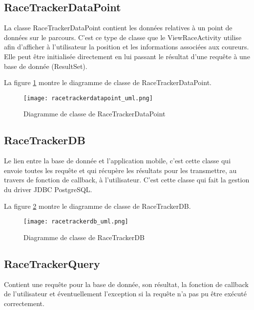 \subsection{RaceTrackerDataPoint}

La classe RaceTrackerDataPoint contient les données relatives à un point de données sur le parcours. C'est ce type de classe que le ViewRaceActivity utilise afin d'afficher à l'utilisateur la position et les informations associées aux coureurs. Elle peut être initialisée directement en lui passant le résultat d'une requête à une base de donnée (ResultSet).

La figure \ref{fig:racetrackerdatapoint_uml} montre le diagramme de classe de RaceTrackerDataPoint.

\begin{figure}[htb]
\centering 
\texttt{[image: racetrackerdatapoint\_uml.png]} 
\caption{Diagramme de classe de RaceTrackerDataPoint}
\label{fig:racetrackerdatapoint_uml}
 \end{figure}
 
\subsection{RaceTrackerDB}

Le lien entre la base de donnée et l'application mobile, c'est cette classe qui envoie toutes les requête et qui récupère les résultats pour les transmettre, au travers de fonction de callback, à l'utilisateur. C'est cette classe qui fait la gestion du driver JDBC PostgreSQL.

La figure \ref{fig:racetrackerdb_uml} montre le diagramme de classe de RaceTrackerDB.

\begin{figure}[htb]
\centering 
\texttt{[image: racetrackerdb\_uml.png]} 
\caption{Diagramme de classe de RaceTrackerDB}
\label{fig:racetrackerdb_uml}
 \end{figure}


\subsection{RaceTrackerQuery}

Contient une requête pour la base de donnée, son résultat, la fonction de callback de l'utilisateur et éventuellement l'exception si la requête n'a pas pu être exécuté correctement.

